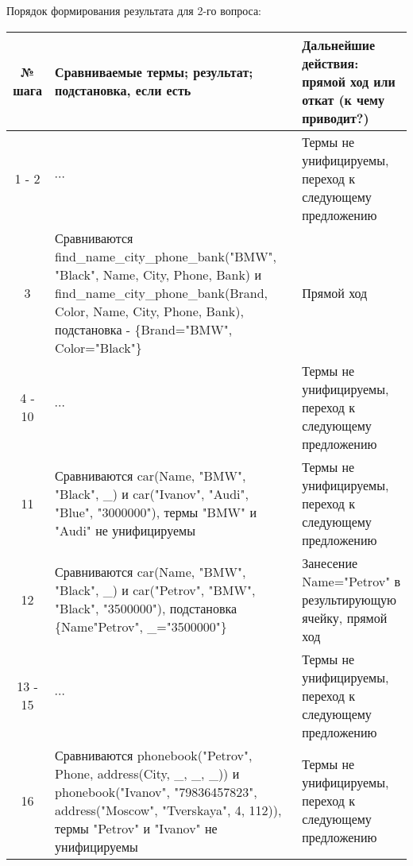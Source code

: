 \documentclass[a4paper,12pt]{article}
\begin{document}
Порядок формирования результата для 2-го вопроса:
\begin{table}[ht!] 
	\begin{tabularx}{\linewidth}{|c|>{\centering}X|>{\centering}X|}
		\hline
		№ шага & Сравниваемые термы; результат; подстановка, если есть & Дальнейшие действия: прямой ход или откат (к чему приводит?)\tabularnewline
		\hline
		1 - 2 & $\cdots$ & Термы не унифицируемы, переход к следующему предложению \tabularnewline
		\hline
		3 & Сравниваются find\_name\_city\_phone\_bank("BMW"{}, "Black"{}, Name, City, Phone, Bank) и find\_name\_city\_phone\_bank(Brand, Color, Name, City, Phone, Bank), подстановка - \{Brand="BMW"{}, Color="Black"\} & Прямой ход \tabularnewline
		\hline
		4 - 10 & $\cdots$ & Термы не унифицируемы, переход к следующему предложению \tabularnewline
		\hline
		11 & Сравниваются car(Name, "BMW"{}, "Black"{}, \_) и car("Ivanov"{}, "Audi"{}, "Blue"{}, "3000000"), термы "BMW"{} и "Audi"{} не унифицируемы & Термы не унифицируемы, переход к следующему предложению \tabularnewline
		\hline
		12 & Сравниваются car(Name, "BMW"{}, "Black"{}, \_) и car("Petrov"{}, "BMW"{}, "Black"{}, "3500000"), подстановка \{Name"Petrov"{}, \_="3500000"\} & Занесение Name="Petrov"{} в результирующую ячейку, прямой ход \tabularnewline
		\hline
		13 - 15 & $\cdots$ & Термы не унифицируемы, переход к следующему предложению \tabularnewline
		\hline
		16 & Сравниваются phonebook("Petrov"{}, Phone, address(City, \_, \_, \_)) и phonebook("Ivanov"{}, "79836457823"{}, address("Moscow"{}, "Tverskaya"{}, 4, 112)), термы "Petrov"{} и "Ivanov"{} не унифицируемы & Термы не унифицируемы, переход к следующему предложению \tabularnewline
		\hline
	\end{tabularx}
\end{table}
\newpage
\end{document}
